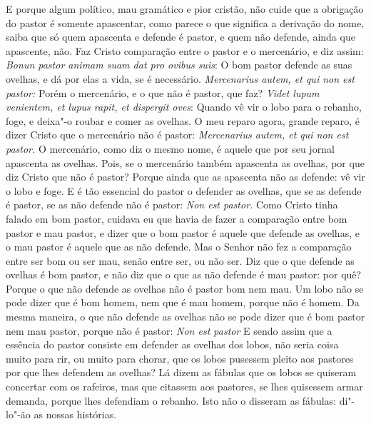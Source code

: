 E porque algum político, mau gramático e pior cristão, não cuide que a
obrigação do pastor é somente apascentar, como parece o que significa a
derivação do nome, saiba que só quem apascenta e defende é pastor, e
quem não defende, ainda que apascente, não. Faz Cristo comparação entre
o pastor e o mercenário, e diz assim: \emph{Bonun pastor animam suam dat
pro ovibus suis}: O bom pastor defende as suas ovelhas, e %
dá por elas a vida, se é necessário. \emph{Mercenarius autem, et qui non
est pastor:} Porém o mercenário, e o que não é pastor, que faz?
\emph{Videt lupum venientem, et lupus rapit, et dispergit oves}: %
Quando vê vir o lobo para o rebanho, foge, e deixa"-o roubar e comer
as ovelhas. O meu reparo agora, grande reparo, é dizer Cristo que o
mercenário não é pastor: \emph{Mercenarius autem, et qui non est pastor.} O mercenário, como diz o mesmo nome, é aquele que por seu jornal
apascenta as ovelhas. Pois, se o mercenário também apascenta as ovelhas,
por que diz Cristo que não é pastor? Porque ainda que as apascenta não
as defende: vê vir o lobo e foge. E é tão essencial do pastor o defender
as ovelhas, que se as defende é pastor, se as não defende não é pastor:
\emph{Non est pastor.} Como Cristo tinha falado em bom pastor, cuidava
eu que havia de fazer a comparação entre bom pastor e mau pastor, e
dizer que o bom pastor é aquele que defende as ovelhas, e o mau pastor é
aquele que as não defende. Mas o Senhor não fez a comparação entre ser
bom ou ser mau, senão entre ser, ou não ser. Diz que o que defende as
ovelhas é bom pastor, e não diz que o que as não defende é mau pastor:
por quê? Porque o que não defende as ovelhas não é pastor bom nem mau.
Um lobo não se pode dizer que é bom homem, nem que é mau homem, porque
não é homem. Da mesma maneira, o que não defende as ovelhas não se pode
dizer que é bom pastor nem mau pastor, porque não é pastor: \emph{Non
est pastor} E sendo assim que a essência do pastor consiste em defender
as ovelhas dos lobos, não seria coisa muito para rir, ou muito para
chorar, que os lobos pusessem pleito aos pastores por que lhes defendem
as ovelhas? Lá dizem as fábulas que os lobos se quiseram concertar com
os rafeiros, mas que citassem aos pastores, se lhes quisessem armar
demanda, porque lhes defendiam o rebanho. Isto não o disseram as
fábulas: di"-lo"-ão as nossas histórias.

